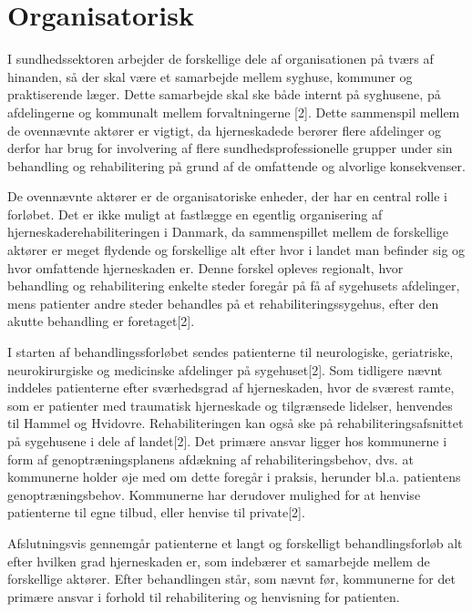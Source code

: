 \section{Organisatorisk}
I sundhedssektoren arbejder de forskellige dele af organisationen på tværs af hinanden, så der skal være et samarbejde mellem syghuse, kommuner og praktiserende læger. Dette samarbejde skal ske både internt på syghusene, på afdelingerne og kommunalt mellem forvaltningerne [2]. Dette sammenspil mellem de ovennævnte aktører er vigtigt, da hjerneskadede berører flere afdelinger og derfor har brug for involvering af flere sundhedsprofessionelle grupper under sin behandling og rehabilitering på grund af de omfattende og alvorlige konsekvenser.

De ovennævnte aktører er de organisatoriske enheder, der har en central rolle i forløbet. Det er ikke muligt at fastlægge en egentlig organisering af hjerneskaderehabiliteringen i Danmark, da sammenspillet mellem de forskellige aktører er meget flydende og forskellige alt efter hvor i landet man befinder sig og hvor omfattende hjerneskaden er. Denne forskel opleves regionalt, hvor behandling og rehabilitering enkelte steder foregår på få af sygehusets afdelinger, mens patienter andre steder behandles på et rehabiliteringssygehus, efter den akutte behandling er foretaget[2]. 

I starten af behandlingssforløbet sendes patienterne til neurologiske, geriatriske, neurokirurgiske og medicinske afdelinger på sygehuset[2]. Som tidligere nævnt inddeles patienterne efter sværhedsgrad af hjerneskaden, hvor de sværest ramte, som er patienter med traumatisk hjerneskade og tilgrænsede lidelser, henvendes til Hammel og Hvidovre. Rehabiliteringen kan også ske på rehabiliteringsafsnittet på sygehusene i dele af landet[2].
Det primære ansvar ligger hos kommunerne i form af genoptræningsplanens afdækning af rehabiliteringsbehov, dvs. at kommunerne holder øje med om dette foregår i praksis, herunder bl.a. patientens genoptræningsbehov. Kommunerne har derudover mulighed for at henvise patienterne til egne tilbud, eller henvise til private[2]. 

Afslutningsvis gennemgår patienterne et langt og forskelligt behandlingsforløb alt efter hvilken grad hjerneskaden er, som indebærer et samarbejde mellem de forskellige aktører. Efter behandlingen står, som nævnt før, kommunerne for det primære ansvar i forhold til rehabilitering og henvisning for patienten.
  



